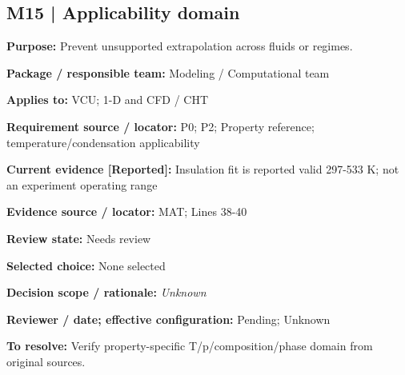 \documentclass[11pt]{article}
\begin{document}
\par\noindent\begin{minipage}{\textwidth}\small\setlength{\parskip}{2pt}
\subsection*{M15 | Applicability domain}
\textbf{Purpose:} Prevent unsupported extrapolation across fluids or regimes.\par
\textbf{Package / responsible team:} Modeling / Computational team\par
\textbf{Applies to:} VCU; 1-D and CFD / CHT\par
\textbf{Requirement source / locator:} P0; P2; Property reference; temperature/condensation applicability\par
\textbf{Current evidence [Reported]:} Insulation fit is reported valid 297-533 K; not an experiment operating range\par
\textbf{Evidence source / locator:} MAT; Lines 38-40\par
\textbf{Review state:} Needs review\par
\textbf{Selected choice:} None selected\par
\textbf{Decision scope / rationale:} \textit{Unknown}\par
\textbf{Reviewer / date; effective configuration:} Pending; Unknown\par
\textbf{To resolve:} Verify property-specific T/p/composition/phase domain from original sources.\par
\end{minipage}\par\vspace{5pt}
\end{document}
